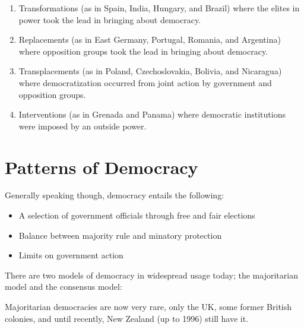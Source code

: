 \begin{enumerate}
  \item Transformations (as in Spain, India, Hungary, and Brazil) where
    the elites in power took the lead in bringing about democracy.
  \item Replacements (as in East Germany, Portugal, Romania, and
    Argentina) where opposition groups took the lead in bringing about
    democracy.
  \item Transplacements (as in Poland, Czechoslovakia, Bolivia, and
    Nicaragua) where democratization occurred from joint action by
    government and opposition groups.
  \item Interventions (as in Grenada and Panama) where democratic
    institutions were imposed by an outside power.
\end{enumerate}

\section{Patterns of Democracy}





Generally speaking though, democracy entails the following:
\begin{itemize}
  \item A selection of government officials through free and fair
    elections
  \item Balance between majority rule and minatory protection
  \item Limits on government action
\end{itemize}

There are two models of democracy in widespread usage today; the
majoritarian model and the consensus model:

Majoritarian democracies are now very rare, only the UK, some former
British colonies, and until recently, New Zealand (up to 1996) still
have it.

